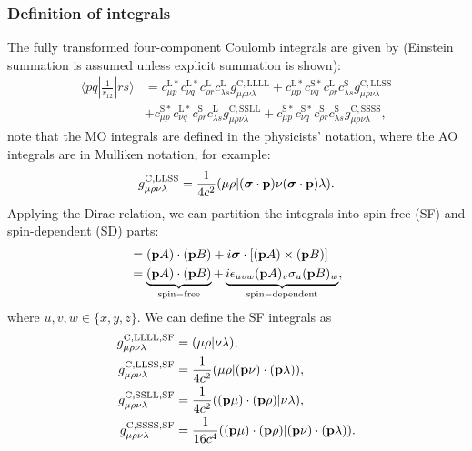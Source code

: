 \documentclass{article}
\begin{document}
\subsubsection{Definition of integrals}
The fully transformed four-component Coulomb integrals are given by (Einstein summation is assumed unless explicit summation is shown):
\begin{align}
    \langle pq|\frac{1}{r_{12}}|rs\rangle&=c^{\mathrm{L}*}_{\mu p}c^{\mathrm{L}*}_{\nu q}c^{\mathrm{L}}_{\rho r}c^{\mathrm{L}}_{\lambda s}g^{\mathrm{C, LLLL}}_{\mu\rho\nu\lambda} + c^{\mathrm{L}*}_{\mu p}c^{\mathrm{S}*}_{\nu q}c^{\mathrm{L}}_{\rho r}c^{\mathrm{S}}_{\lambda s}g^{\mathrm{C, LLSS}}_{\mu\rho\nu\lambda}\nonumber\\
    &+c^{\mathrm{S}*}_{\mu p}c^{\mathrm{L}*}_{\nu q}c^{\mathrm{S}}_{\rho r}c^{\mathrm{L}}_{\lambda s}g^{\mathrm{C, SSLL}}_{\mu\rho\nu\lambda}+c^{\mathrm{S}*}_{\mu p}c^{\mathrm{S}*}_{\nu q}c^{\mathrm{S}}_{\rho r}c^{\mathrm{S}}_{\lambda s}g^{\mathrm{C, SSSS}}_{\mu\rho\nu\lambda},
\end{align}
note that the MO integrals are defined in the physicists' notation, where the AO integrals are in Mulliken notation, for example:
\begin{equation}
    g^{\mathrm{C, LLSS}}_{\mu\rho\nu\lambda}=\frac{1}{4c^2}(\mu\rho|(\bm{\mathrm{\sigma}}\cdot\bm{\mathrm{p}})\nu(\bm{\mathrm{\sigma}}\cdot\bm{\mathrm{p}})\lambda).
\end{equation}
Applying the Dirac relation, we can partition the integrals into spin-free (SF) and spin-dependent (SD) parts:
\begin{align}
    [(\bvec{\sigma}\cdot\bvec{p})A][(\bvec{\sigma}\cdot\bvec{p})B]&=(\bvec{p}A)\cdot(\bvec{p}B)+i\bvec{\sigma}\cdot[(\bvec{p}A)\times(\bvec{p}B)]\\
    &=\underbrace{(\bvec{p}A)\cdot(\bvec{p}B)}_{\mathrm{spin-free}}+\underbrace{i\epsilon_{uvw}(\bvec{p}A)_{v}\sigma_u(\bvec{p}B)_w}_{\mathrm{spin-dependent}},
\end{align}
where $u,v,w\in\{x,y,z\}$. We can define the SF integrals as
\begin{align}
    g^{\mathrm{C, LLLL, SF}}_{\mu\rho\nu\lambda} &= (\mu\rho|\nu\lambda),\\
    g^{\mathrm{C, LLSS, SF}}_{\mu\rho\nu\lambda} &= \frac{1}{4c^2}(\mu\rho|(\bm{\mathrm{p}}\nu)\cdot(\bm{\mathrm{p}}\lambda)),\\
    g^{\mathrm{C, SSLL, SF}}_{\mu\rho\nu\lambda} &= \frac{1}{4c^2}((\bm{\mathrm{p}}\mu)\cdot(\bm{\mathrm{p}}\rho)|\nu\lambda),\\
    g^{\mathrm{C, SSSS, SF}}_{\mu\rho\nu\lambda} &= \frac{1}{16c^4}((\bm{\mathrm{p}}\mu)\cdot(\bm{\mathrm{p}}\rho)|(\bm{\mathrm{p}}\nu)\cdot(\bm{\mathrm{p}}\lambda)).
\end{align}
\end{document}
